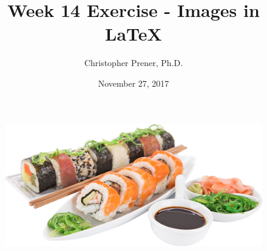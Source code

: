 \documentclass{article}
\title{Week 14 Exercise - Images in LaTeX}
\author{Christopher Prener, Ph.D.}
\date{November 27, 2017}
\begin{document}
\maketitle %

\begin{figure}[!h]
\includegraphics[scale=.35]{"sushi"}
\end{figure}

\end{document}
